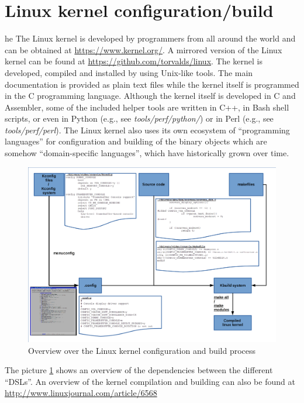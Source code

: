 \section{Linux kernel configuration/build}
he The Linux kernel is developed by programmers from all around the world 
and can be obtained at \url{https://www.kernel.org/}\cite{Kernel_1}.
A mirrored version of the Linux kernel can be found at \url{https://github.com/torvalds/linux}\cite{Kernel_2}.
The kernel is developed, compiled and installed by using Unix-like tools.
The main documentation is provided as plain text files while the kernel itself is programmed 
in the C programming language. Although the kernel itself is developed in C and Assembler,
some of the included helper tools are written in C++, in Bash shell scripts, or even in Python 
(e.g., see {\it tools/perf/python/}) or in Perl (e.g., see {\it tools/perf/perl}).
The Linux kernel also uses its own ecosystem of ``programming languages'' for configuration and 
building of the binary objects which are somehow ``domain-specific languages'', 
which have historically grown over time. 
\begin{figure}[ht]
  \centering
  \includegraphics[scale=0.4]{images/overview}
  \caption{Overview over the Linux kernel configuration and build process}
  \label{fig:overview}
\end{figure}

The picture \ref{fig:overview} shows an overview of the dependencies between the different ``DSLs''.
An overview of the kernel compilation and building can also be found at 
\url{http://www.linuxjournal.com/article/6568}\cite{Kernel_3}

